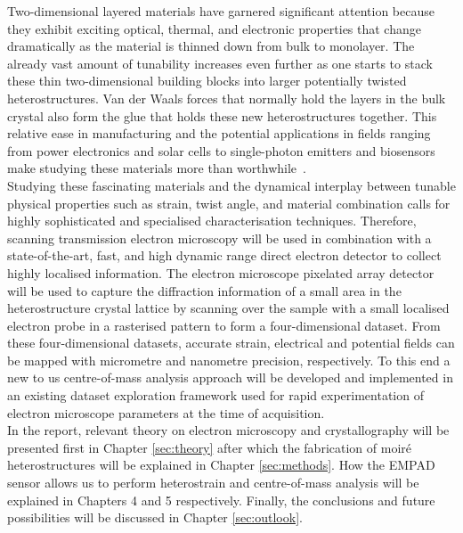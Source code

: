 Two-dimensional layered materials have garnered significant attention because they exhibit exciting optical, thermal, and electronic properties that change dramatically as the material is thinned down from bulk to monolayer. The already vast amount of tunability increases even further as one starts to stack these thin two-dimensional building blocks into larger potentially twisted heterostructures. Van der Waals forces that normally hold the layers in the bulk crystal also form the glue that holds these new heterostructures together. This relative ease in manufacturing and the potential applications in fields ranging from power electronics and solar cells to single-photon emitters and biosensors make studying these materials more than worthwhile~\cite{LI2016322, https://doi.org/10.1002/smll.202107059}.\\
Studying these fascinating materials and the dynamical interplay between tunable physical properties such as strain, twist angle, and material combination calls for highly sophisticated and specialised characterisation techniques. Therefore, scanning transmission electron microscopy will be used in combination with a state-of-the-art, fast, and high dynamic range direct electron detector to collect highly localised information. The electron microscope pixelated array detector will be used to capture the diffraction information of a small area in the heterostructure crystal lattice by scanning over the sample with a small localised electron probe in a rasterised pattern to form a four-dimensional dataset. From these four-dimensional datasets, accurate strain, electrical and potential fields can be mapped with micrometre and nanometre precision, respectively. To this end a new to us centre-of-mass analysis approach will be developed and implemented in an existing dataset exploration framework used for rapid experimentation of electron microscope parameters at the time of acquisition.\\
In the report, relevant theory on electron microscopy and crystallography will be presented first in Chapter \ref{sec:theory} after which the fabrication of moiré heterostructures will be explained in Chapter \ref{sec:methods}. How the EMPAD sensor allows us to perform heterostrain and centre-of-mass analysis will be explained in Chapters 4 and 5 respectively. Finally, the conclusions and future possibilities will be discussed in Chapter \ref{sec:outlook}.

